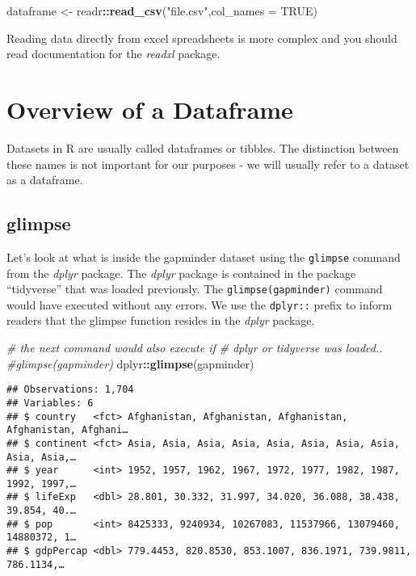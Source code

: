 \documentclass[]{book}
\newenvironment{Shaded}{\begin{snugshade}}{\end{snugshade}}
\newcommand{\KeywordTok}[1]{\textcolor[rgb]{0.13,0.29,0.53}{\textbf{#1}}}
\newcommand{\DataTypeTok}[1]{\textcolor[rgb]{0.13,0.29,0.53}{#1}}
\newcommand{\StringTok}[1]{\textcolor[rgb]{0.31,0.60,0.02}{#1}}
\newcommand{\CommentTok}[1]{\textcolor[rgb]{0.56,0.35,0.01}{\textit{#1}}}
\newcommand{\OtherTok}[1]{\textcolor[rgb]{0.56,0.35,0.01}{#1}}
\newcommand{\OperatorTok}[1]{\textcolor[rgb]{0.81,0.36,0.00}{\textbf{#1}}}
\newcommand{\NormalTok}[1]{#1}
\begin{document}
\begin{Shaded}
\begin{Highlighting}[]
\NormalTok{dataframe <-}\StringTok{ }\NormalTok{readr}\OperatorTok{::}\KeywordTok{read_csv}\NormalTok{(}\StringTok{"file.csv"}\NormalTok{,}\DataTypeTok{col_names =} \OtherTok{TRUE}\NormalTok{)}
\end{Highlighting}
\end{Shaded}

Reading data directly from excel spreadsheets is more complex and you
should read documentation for the \emph{readxl} package.

\chapter{Overview of a Dataframe}\label{OverviewDataframe}

Datasets in R are usually called dataframes or tibbles. The distinction
between these names is not important for our purposes - we will usually
refer to a dataset as a dataframe.

\section{glimpse}\label{glimpse}

Let's look at what is inside the gapminder dataset using the
\texttt{glimpse} command from the \emph{dplyr} package. The \emph{dplyr}
package is contained in the package ``tidyverse'' that was loaded
previously. The \texttt{glimpse(gapminder)} command would have executed
without any errors. We use the \texttt{dplyr::} prefix to inform readers
that the glimpse function resides in the \emph{dplyr} package.

\begin{Shaded}
\begin{Highlighting}[]
\CommentTok{# the next command would also execute if}
\CommentTok{# dplyr or tidyverse was loaded..}
\CommentTok{#glimpse(gapminder)}
\NormalTok{dplyr}\OperatorTok{::}\KeywordTok{glimpse}\NormalTok{(gapminder)}
\end{Highlighting}
\end{Shaded}

\begin{verbatim}
## Observations: 1,704
## Variables: 6
## $ country   <fct> Afghanistan, Afghanistan, Afghanistan, Afghanistan, Afghani…
## $ continent <fct> Asia, Asia, Asia, Asia, Asia, Asia, Asia, Asia, Asia, Asia,…
## $ year      <int> 1952, 1957, 1962, 1967, 1972, 1977, 1982, 1987, 1992, 1997,…
## $ lifeExp   <dbl> 28.801, 30.332, 31.997, 34.020, 36.088, 38.438, 39.854, 40.…
## $ pop       <int> 8425333, 9240934, 10267083, 11537966, 13079460, 14880372, 1…
## $ gdpPercap <dbl> 779.4453, 820.8530, 853.1007, 836.1971, 739.9811, 786.1134,…
\end{verbatim}
\end{document}
